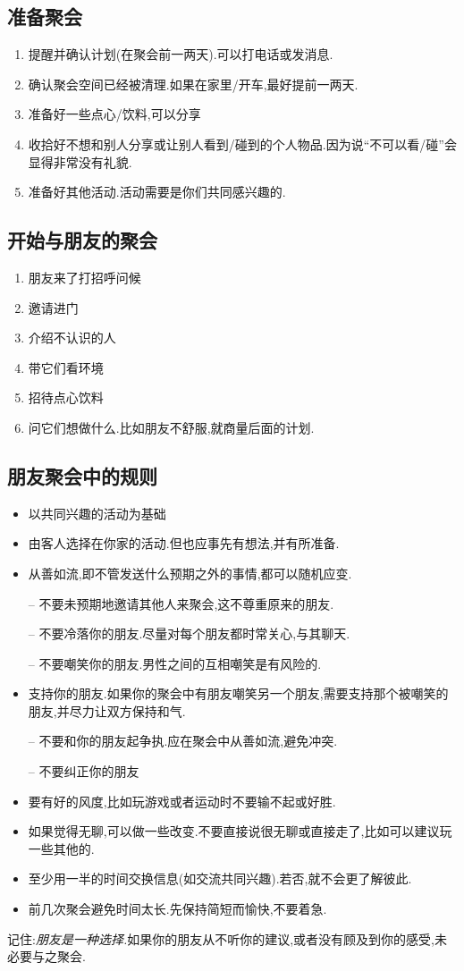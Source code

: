 \documentclass[UTF8]{article}
\newcommand{\dash}{–}
\begin{document}
\subsection{准备聚会}
\begin{enumerate}
    \item 提醒并确认计划(在聚会前一两天).可以打电话或发消息.
    \item 确认聚会空间已经被清理.如果在家里/开车,最好提前一两天.
    \item 准备好一些点心/饮料,可以分享
    \item 收拾好不想和别人分享或让别人看到/碰到的个人物品.因为说``不可以看/碰''会显得非常没有礼貌.
    \item 准备好其他活动.活动需要是你们共同感兴趣的.
\end{enumerate}
\subsection{开始与朋友的聚会}
\begin{enumerate}
    \item 朋友来了打招呼问候
    \item 邀请进门
    \item 介绍不认识的人
    \item 带它们看环境
    \item 招待点心饮料
    \item 问它们想做什么.比如朋友不舒服,就商量后面的计划.
\end{enumerate}
\subsection{朋友聚会中的规则}
\begin{itemize}
    \item 以共同兴趣的活动为基础
    \item 由客人选择在你家的活动.但也应事先有想法,并有所准备.
    \item 从善如流,即不管发送什么预期之外的事情,都可以随机应变.
    \item[\dash] 不要未预期地邀请其他人来聚会,这不尊重原来的朋友.
    \item[\dash] 不要冷落你的朋友.尽量对每个朋友都时常关心,与其聊天.
    \item[\dash] 不要嘲笑你的朋友.男性之间的互相嘲笑是有风险的.
    \item 支持你的朋友.如果你的聚会中有朋友嘲笑另一个朋友,需要支持那个被嘲笑的朋友,并尽力让双方保持和气.
    \item[\dash] 不要和你的朋友起争执.应在聚会中从善如流,避免冲突.
    \item[\dash] 不要纠正你的朋友
    \item 要有好的风度,比如玩游戏或者运动时不要输不起或好胜.
    \item 如果觉得无聊,可以做一些改变.不要直接说很无聊或直接走了,比如可以建议玩一些其他的.
    \item 至少用一半的时间交换信息(如交流共同兴趣).若否,就不会更了解彼此.
    \item 前几次聚会避免时间太长.先保持简短而愉快,不要着急.
\end{itemize}
记住:\emph{朋友是一种选择.}如果你的朋友从不听你的建议,或者没有顾及到你的感受,未必要与之聚会.
\end{document}
